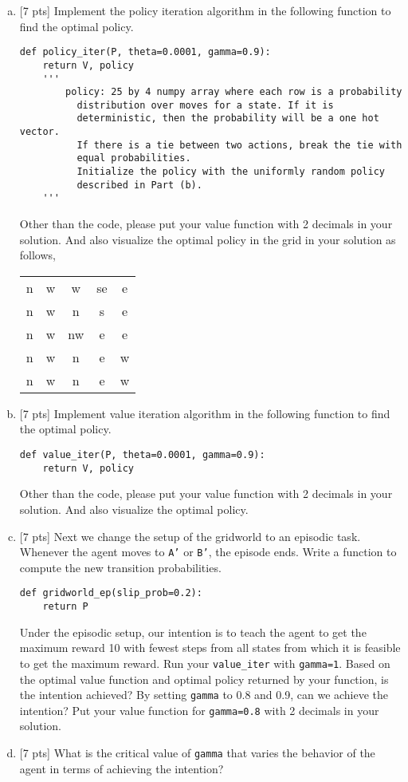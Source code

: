 \begin{enumerate}[(a)]
    \item{}[7 pts] Implement the policy iteration algorithm in the following
    function to find the optimal policy.
    \begin{verbatim}
def policy_iter(P, theta=0.0001, gamma=0.9):
    return V, policy
    '''
        policy: 25 by 4 numpy array where each row is a probability
          distribution over moves for a state. If it is
          deterministic, then the probability will be a one hot vector.
          If there is a tie between two actions, break the tie with
          equal probabilities.
          Initialize the policy with the uniformly random policy
          described in Part (b).
    '''
    \end{verbatim}
    Other than the code, please put your value function with 2 decimals
    in your solution. And also visualize the optimal policy in
    the grid in your solution as follows,
    \begin{tabular}{ccccc}
      n & w & w & se & e \\
      n & w & n & s & e \\
      n & w & nw & e & e \\
      n & w & n & e & w \\
      n & w & n & e & w \\
    \end{tabular}

    \item{}[7 pts] Implement value iteration algorithm in the following
    function to find the optimal policy.
    \begin{verbatim}
def value_iter(P, theta=0.0001, gamma=0.9):
    return V, policy
    \end{verbatim}
    Other than the code, please put your value function with 2 decimals
    in your solution. And also visualize the optimal policy.

    \item{}[7 pts] Next we change the setup of the gridworld to an episodic task.
    Whenever the agent moves to \texttt{A'} or \texttt{B'}, the episode ends.
    Write a function to compute the new transition probabilities.
    \begin{verbatim}
def gridworld_ep(slip_prob=0.2):
    return P
    \end{verbatim}
    Under the episodic setup, our intention is to teach the agent to get the
    maximum reward 10 with fewest steps from all states from which it is
    feasible to get the maximum reward. Run your \texttt{value\_iter} with
    \texttt{gamma=1}. Based on the optimal value function and optimal policy returned by your
    function, is the intention achieved?
    By setting \texttt{gamma} to 0.8 and 0.9, can we achieve the intention?
    Put your value function for \texttt{gamma=0.8} with 2 decimals in your
    solution.

    \item{}[7 pts] What is the critical value of \texttt{gamma} that varies the behavior of
    the agent in terms of achieving the intention? 
\end{enumerate}
